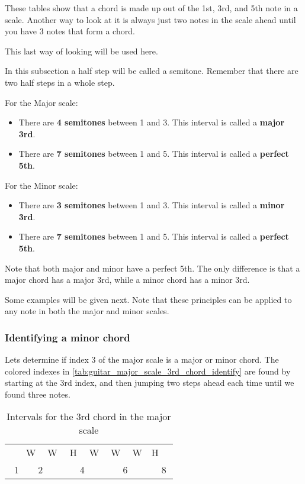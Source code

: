 These tables show that a chord is made up out of the 1st, 3rd, and 5th note in a scale. Another way to look at it is always just two notes in the scale ahead until you have 3 notes that form a chord.

This last way of looking will be used here.

In this subsection a half step will be called a semitone. Remember that there are two half steps in a whole step.

For the Major scale:

\begin{itemize}
	\item There are \textbf{4 semitones} between 1 and 3. This interval is called a \textbf{major 3rd}.
	\item There are \textbf{7 semitones} between 1 and 5. This interval is called a \textbf{perfect 5th}.
\end{itemize}

For the Minor scale:

\begin{itemize}
	\item There are \textbf{3 semitones} between 1 and 3. This interval is called a \textbf{minor 3rd}.
	\item There are \textbf{7 semitones} between 1 and 5. This interval is called a \textbf{perfect 5th}.
\end{itemize}

Note that both major and minor have a perfect 5th. The only difference is that a major chord has a major 3rd, while a minor chord has a minor 3rd.

Some examples will be given next. Note that these principles can be applied to any note in both the major and minor scales.

\newpage

\subsubsection{Identifying a minor chord}
Lets determine if index 3 of the major scale is a major or minor chord. The colored indexes in \autoref{tab:guitar_major_scale_3rd_chord_identify} are found by starting at the 3rd index, and then jumping two steps ahead each time until we found three notes.

\begin{table}[h]
	\centering
	\begin{tabular}{*{16}{c}}
		& \multicolumn{2}{P{4mm}}{\large{W}} & \multicolumn{2}{P{4mm}}{\large{W}} & \multicolumn{2}{P{4mm}}{\large{H}} & \multicolumn{2}{P{4mm}}{\large{W}} & \multicolumn{2}{P{4mm}}{\large{W}} & \multicolumn{2}{P{4mm}}{\large{W}} & \multicolumn{2}{P{4mm}}{\large{H}} & \\
		\multicolumn{2}{P{4mm}}{1} & \multicolumn{2}{P{4mm}}{2} & \multicolumn{2}{P{4mm}}{\ScaleRootCellFill 3} & \multicolumn{2}{P{4mm}}{4} & \multicolumn{2}{P{4mm}}{\ScaleCellFill 5} & \multicolumn{2}{P{4mm}}{6} & \multicolumn{2}{P{4mm}}{\ScaleCellFill 7} & \multicolumn{2}{P{4mm}}{8}
	\end{tabular}
	\caption{Intervals for the 3rd chord in the major scale}
	\label{tab:guitar_major_scale_3rd_chord_identify}
\end{table}

